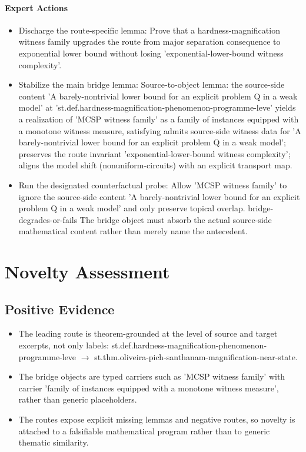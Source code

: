 \documentclass[11pt]{article}
\begin{document}
\paragraph{Expert Actions}
\begin{itemize}[leftmargin=*,itemsep=0.2em]
\item Discharge the route-specific lemma: Prove that a hardness-magnification witness family upgrades the route from major separation consequence to exponential lower bound without losing 'exponential-lower-bound witness complexity'.
\item Stabilize the main bridge lemma: Source-to-object lemma: the source-side content 'A barely-nontrivial lower bound for an explicit problem Q in a weak model' at 'st.def.hardness-magnification-phenomenon-programme-leve' yields a realization of 'MCSP witness family' as a family of instances equipped with a monotone witness measure, satisfying admits source-side witness data for 'A barely-nontrivial lower bound for an explicit problem Q in a weak model'; preserves the route invariant 'exponential-lower-bound witness complexity'; aligns the model shift (nonuniform-circuits) with an explicit transport map.
\item Run the designated counterfactual probe: Allow 'MCSP witness family' to ignore the source-side content 'A barely-nontrivial lower bound for an explicit problem Q in a weak model' and only preserve topical overlap. bridge-degrades-or-fails The bridge object must absorb the actual source-side mathematical content rather than merely name the antecedent.
\end{itemize}

\section{Novelty Assessment}
\subsection{Positive Evidence}
\begin{itemize}[leftmargin=*,itemsep=0.2em]
\item The leading route is theorem-grounded at the level of source and target excerpts, not only labels: st.def.hardness-magnification-phenomenon-programme-leve $\rightarrow$  st.thm.oliveira-pich-santhanam-magnification-near-state.
\item The bridge objects are typed carriers such as 'MCSP witness family' with carrier 'family of instances equipped with a monotone witness measure', rather than generic placeholders.
\item The routes expose explicit missing lemmas and negative routes, so novelty is attached to a falsifiable mathematical program rather than to generic thematic similarity.
\end{itemize}
\end{document}
